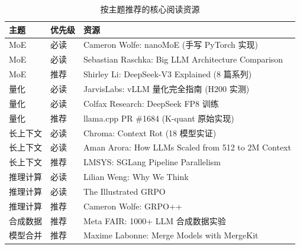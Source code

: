 \documentclass[
  customlatinfont = macos,
]{hkustthesis}
\begin{document}
\begin{table}[H]
\centering\small
\caption{按主题推荐的核心阅读资源}
\label{tab:resources}
\begin{tabularx}{\linewidth}{l l X}
\toprule
\textbf{主题} & \textbf{优先级} & \textbf{资源} \\
\midrule
MoE & 必读 & Cameron Wolfe: nanoMoE (手写 PyTorch 实现) \\
MoE & 必读 & Sebastian Raschka: Big LLM Architecture Comparison \\
MoE & 推荐 & Shirley Li: DeepSeek-V3 Explained (8 篇系列) \\
\midrule
量化 & 必读 & JarvisLabs: vLLM 量化完全指南 (H200 实测) \\
量化 & 必读 & Colfax Research: DeepSeek FP8 训练 \\
量化 & 推荐 & llama.cpp PR \#1684 (K-quant 原始实现) \\
\midrule
长上下文 & 必读 & Chroma: Context Rot (18 模型实证) \\
长上下文 & 必读 & Aman Arora: How LLMs Scaled from 512 to 2M Context \\
长上下文 & 推荐 & LMSYS: SGLang Pipeline Parallelism \\
\midrule
推理计算 & 必读 & Lilian Weng: Why We Think \\
推理计算 & 必读 & The Illustrated GRPO \\
推理计算 & 推荐 & Cameron Wolfe: GRPO++ \\
\midrule
合成数据 & 推荐 & Meta FAIR: 1000+ LLM 合成数据实验 \\
模型合并 & 推荐 & Maxime Labonne: Merge Models with MergeKit \\
\bottomrule
\end{tabularx}
\end{table}


\printbibliography[heading=bibintoc,title=References]
\end{document}
